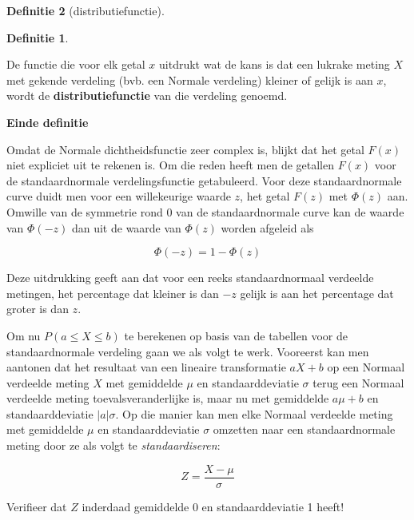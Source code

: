 \documentclass[
  12pt,dutch,coursenotes]{book}
\theoremstyle{definition}
\newtheorem{definition}{Definitie}[chapter]
\theoremstyle{definition}
\theoremstyle{definition}
\theoremstyle{remark}
\begin{document}
\begin{definition}[distributiefunctie]
\begin{definition}

\protect\hypertarget{def:unnamed-chunk-41}{}{\label{def:unnamed-chunk-41} \iffalse (distributiefunctie) \fi{} }

\end{definition}
\end{definition}

De functie die voor elk getal \(x\) uitdrukt wat de kans is dat een lukrake
meting \(X\) met gekende verdeling (bvb. een Normale verdeling) kleiner of
gelijk is aan \(x\), wordt de \textbf{distributiefunctie} van die verdeling
genoemd.

\textbf{Einde definitie}

Omdat de Normale dichtheidsfunctie zeer complex is, blijkt dat het getal \(F(x)\) niet expliciet uit te rekenen is. Om die reden heeft men de getallen \(F(x)\)
voor de standaardnormale verdelingsfunctie getabuleerd. Voor
deze standaardnormale curve duidt men voor een willekeurige waarde \(z\), het
getal \(F(z)\) met \(\Phi(z)\) aan. Omwille van de symmetrie rond 0 van de
standaardnormale curve kan de waarde van \(\Phi(-z)\) dan uit de waarde van \(\Phi(z)\) worden afgeleid als

\begin{equation*}
\Phi(-z)= 1- \Phi(z)
\end{equation*}

Deze uitdrukking geeft aan dat voor een reeks standaardnormaal verdeelde
metingen, het percentage dat kleiner is dan \(-z\) gelijk is aan
het percentage dat groter is dan \(z\).

Om nu \(P(a\leq X\leq b)\) te berekenen op basis van de tabellen voor de
standaardnormale verdeling gaan we als volgt te werk. Vooreerst kan men
aantonen dat het resultaat van een lineaire transformatie \(aX+b\) op een
Normaal verdeelde meting \(X\) met gemiddelde \(\mu\) en standaarddeviatie \(\sigma\) terug een Normaal verdeelde meting toevalsveranderlijke is, maar nu
met gemiddelde \(a\mu+b\) en standaarddeviatie \(|a|\sigma\). Op die manier kan
men elke Normaal verdeelde meting met gemiddelde \(\mu\) en standaarddeviatie \(\sigma\) omzetten naar een standaardnormale meting door ze als volgt te
\emph{standaardiseren}:

\begin{equation*}
Z = \frac{X- \mu}{\sigma}
\end{equation*}

Verifieer dat \(Z\) inderdaad gemiddelde 0 en standaarddeviatie 1 heeft!
\end{document}
